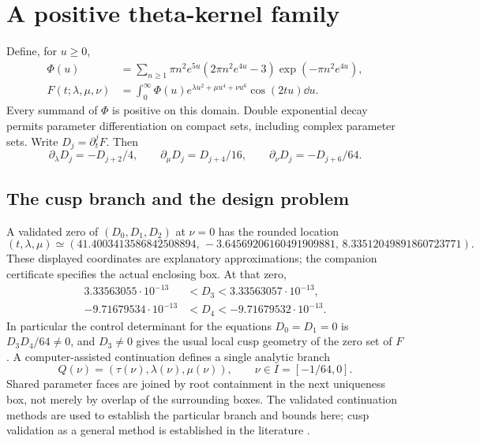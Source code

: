 \section{A positive theta-kernel family}\label{sec:theta}
Define, for \(u\geq0\),
\begin{align}
 \Phi(u)&=\sum_{n\geq1}\pi n^2e^{5u}
       (2\pi n^2e^{4u}-3)\exp(-\pi n^2e^{4u}),\label{eq:theta}\\
 F(t;\lambda,\mu,\nu)&=\int_0^\infty
       \Phi(u)e^{\lambda u^2+\mu u^4+\nu u^6}\cos(2tu)\dd u .
                                                        \label{eq:F}
\end{align}
Every summand of \(\Phi\) is positive on this domain.
Double exponential decay permits parameter differentiation on compact
sets, including complex parameter sets.
Write \(D_j=\partial_t^jF\). Then
\begin{equation}\label{eq:momentdictionary}
 \partial_\lambda D_j=-D_{j+2}/4,\qquad
 \partial_\mu D_j=D_{j+4}/16,\qquad
 \partial_\nu D_j=-D_{j+6}/64 .
\end{equation}

\subsection{The cusp branch and the design problem}
A validated zero of \((D_0,D_1,D_2)\) at \(\nu=0\) has the rounded
location
\[
 (t,\lambda,\mu)\simeq
 (41.4003413586842508894,\,
  -3.64569206160491909881,\,
   8.33512049891860723771).
\]
These displayed coordinates are explanatory approximations; the
companion certificate specifies the actual enclosing box.
At that zero,
\begin{align*}
 3.33563055\cdot10^{-13}&<D_3<3.33563057\cdot10^{-13},\\
 -9.71679534\cdot10^{-13}&<D_4<-9.71679532\cdot10^{-13}.
\end{align*}
In particular the control determinant for the equations \(D_0=D_1=0\)
is \(D_3D_4/64\ne0\), and \(D_3\ne0\) gives the usual local cusp
geometry of the zero set of \(F\). A computer-assisted continuation
defines a single analytic branch
\[
 Q(\nu)=(\tau(\nu),\lambda(\nu),\mu(\nu)),\qquad
 \nu\in I=[-1/64,0].
\]
Shared parameter faces are joined by root containment in the next
uniqueness box, not merely by overlap of the surrounding boxes.
The validated continuation methods are used to establish the particular
branch and bounds here; cusp validation as a general method is established
in the literature \cite{lessard}.

